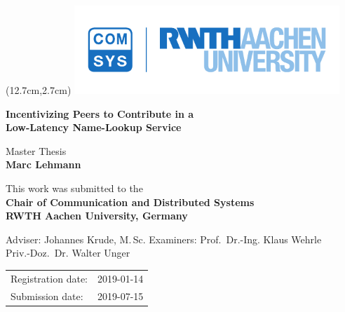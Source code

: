 
\titlehead{
} %


\begin{titlepage}

\begin{textblock*}{10cm} (12.7cm,2.7cm)
\includegraphics[width=10cm,keepaspectratio]{logos/rwth_comsys_bild_cmyk}
\end{textblock*}

\let\footnotesize\small \let\footnoterule\relax

\hbox{}
\vfill

\centering

\begin{doublespace}
{\huge\sffamily\textbf{Incentivizing Peers to Contribute in a \\[5pt]
                       Low-Latency Name-Lookup Service}}
\end{doublespace}
\vskip 2cm

{\large\sffamily

Master Thesis\\[5pt]
\textbf{Marc Lehmann}
\vskip 1cm

This work was submitted to the\\[5pt]
\textbf{Chair of Communication and Distributed Systems\\[5pt]
        RWTH Aachen University, Germany}
\vskip 2cm

Adviser:
\vskip 2mm
Johannes Krude, M.$\,$Sc.
\vskip 5mm
Examiners:
\vskip 2mm
Prof.~Dr.-Ing. Klaus Wehrle\\
Priv.-Doz.~Dr. Walter Unger
\vskip 1cm

\begin{tabular}{R{6cm}p{6cm}}
Registration date:  & 2019-01-14 \\
Submission date:    & 2019-07-15 \\
\end{tabular}

} %

\vfill

\end{titlepage}
